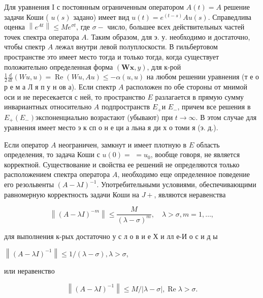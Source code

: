 \documentclass[10pt]{article}
\begin{document}
Для уравнения I с постоянным ограниченным оператором $A(t)=A$ решение задачи Коши ( $u(s)$ задано) имеет вид $u(t)=e^{(t-s)} A u(s)$. Справедлива оценка $\left\|e^{A t}\right\| \leqslant M e^{\sigma t}$, где $\sigma-$ число, большее всех действительных частей точек спектра оператора $A$. Таким образом, для э. у. необходимо и достаточно, чтобы спектр $A$ лежал внутри левой полуплоскости. В гильбертовом пространстве это имеет место тогда и только тогда, когда существует положительно определенная форма $(\boldsymbol{W} \boldsymbol{x}, y)$, для к-рой $\frac{1}{2} \frac{d}{d t}(W u, u)=\operatorname{Re}(W u, A u) \leqslant-\alpha(u, u)$ на любом решении уравнения (т е о р е м а Л я п у н ов а). Если спектр $A$ расположен по обе стороны от мнимой оси и не пересекается с ней, то пространство $E$ разлагается в прямую сумму инвариантных относительно $A$ подпространств $E_{+}$и $E_{-}$, причем все решения в $E_{+}\left(E_{-}\right)$экспоненциально возрастают (убывают) при $t \rightarrow \infty$. В этом случае для уравнения имеет место э к сп о н е ци а льна я ди х о томи я (э. д.).



Если оператор $A$ неограничен, замкнут и имеет плотную в $E$ область определения, то задача Коши с $u(0)=$ $=u_{0}$, вообще говоря, не является корректной. Существование и свойства ее решений не определяются только расположением спектра оператора $A$, необходимо еще определенное поведение его резольвенты $(A-\lambda I)^{-1}$. Употребительными условиями, обеспечивающими равномерную корректность задачи Коши на $J+$, являются неравенства



\[

\left\|(A-\lambda I)^{-m}\right\| \leqslant \frac{M}{(\lambda-\sigma)^{m}}, \quad \lambda>\sigma, m=1, \ldots,

\]



для выполнения к-рых достаточно у с л о в и е Х и лл е-И о с и д ы



$\left\|(A-\lambda I)^{-1}\right\| \leqslant 1 /(\lambda-\sigma), \lambda>\sigma$,



или неравенство



\[

\left\|(A-\lambda I)^{-1}\right\| \leqslant M /|\lambda-\sigma|, \operatorname{Re} \lambda>\sigma .

\]
\end{document}
